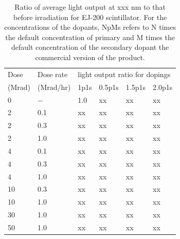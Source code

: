 \documentclass[review]{elsarticle}
\begin{document}
\begin{table}[thb]
\centering
\caption{
Ratio of average light output at {\color{red} xxx nm} to that before irradiation
for EJ-200 scintillator.  For the concentrations
of the dopants, NpMs refers to N times the default concentration of primary and M times the default concentration of the secondary dopant
the commercial version of the product.
}
\label{tab:ResultsEJ200}
{\small
\begin{tabular}{|l| l| l| l| l| l|}
\hline
Dose & Dose rate  &\multicolumn{4}{|l|}{light output ratio for dopings} \\
(Mrad)  & (Mrad/hr) & 1p1s & 0.5p1s & 1.5p1s & 2.0p1s   \\
\hline
\hline
0 & $-$ & 1.0 & {\color{red} xx} & {\color{red} xx} & {\color{red} xx}\\ \hline
2 & 0.1 & {\color{red} xx} & {\color{red} xx} & {\color{red} xx} & {\color{red} xx}\\
2 & 0.3 & {\color{red} xx} & {\color{red} xx} & {\color{red} xx} & {\color{red} xx}\\
2 & 1.0 & {\color{red} xx} & {\color{red} xx} & {\color{red} xx} & {\color{red} xx}\\ \hline
4 & 0.1 & {\color{red} xx} & {\color{red} xx} & {\color{red} xx} & {\color{red} xx}\\
4 & 0.3 & {\color{red} xx} & {\color{red} xx} & {\color{red} xx} & {\color{red} xx}\\
4 & 1.0 & {\color{red} xx} & {\color{red} xx} & {\color{red} xx} & {\color{red} xx}\\ \hline
10 & 0.3 & {\color{red} xx} & {\color{red} xx} & {\color{red} xx} & {\color{red} xx}\\
10 & 1.0 & {\color{red} xx} & {\color{red} xx} & {\color{red} xx} & {\color{red} xx}\\ \hline
30 & 1.0 & {\color{red} xx} & {\color{red} xx} & {\color{red} xx} & {\color{red} xx}\\ \hline
50 & 1.0 & {\color{red} xx} & {\color{red} xx} & {\color{red} xx} & {\color{red} xx}\\ \hline
\hline
\end{tabular}
}
\end{table}
\end{document}
